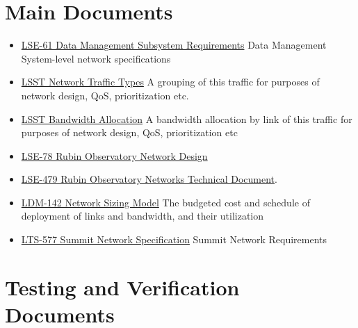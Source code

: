 
\section{Main Documents}

\begin{itemize}
    \item \href{https://confluence.lsstcorp.org/download/attachments/20284335/LSE-61.pdf?version=1&modificationDate=1490879770000&api=v2}{LSE-61 Data Management Subsystem Requirements} Data Management System-level network specifications 
    \item \href{https://confluence.lsstcorp.org/display/DM/LSST+Network+Traffic+Types}{LSST Network Traffic Types} A grouping of this traffic for purposes of network design, QoS, prioritization etc.
    \item \href{https://confluence.lsstcorp.org/display/DM/LSST+Network+Bandwidth+Allocation}{LSST Bandwidth Allocation} A bandwidth allocation by link of this traffic for purposes of network design, QoS, prioritization etc
    \item  \href{https://docushare.lsstcorp.org/docushare/dsweb/Get/LSE-78/lse78observatoryNetworkDesign_rel5.1_20200825.pdf}{LSE-78 Rubin Observatory Network Design}
    \item \href{https://docushare.lsstcorp.org/docushare/dsweb/Get/LSE-479/lse479observatoryNetworkTechnicalDoc_rel1_20200825.pdf}{LSE-479 Rubin Observatory Networks Technical Document}.
    \item  \href{https://confluence.lsstcorp.org/download/attachments/20284335/20170130%20LDM-142%20LSST%20Networks%20BL%20and%20Plan.xls?version=1&modificationDate=1491479508000&api=v2}{LDM-142 Network Sizing Model} The budgeted cost and schedule of deployment of links and bandwidth, and their utilization
    \item \href{https://docushare.lsstcorp.org/docushare/dsweb/Get/LTS-577/LTS-577%20Summit%20Network%20Specification%20Rel1%2006292017.pdf}{LTS-577 Summit Network Specification} Summit Network Requirements
\end{itemize}

\section{Testing and Verification Documents}

